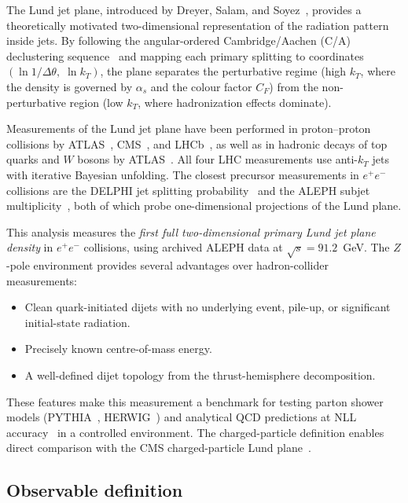 \documentclass[11pt,a4paper]{article}
\begin{document}
The Lund jet plane, introduced by Dreyer, Salam, and
Soyez~\cite{Dreyer:2018nbf}, provides a theoretically motivated
two-dimensional representation of the radiation pattern inside jets.
By following the angular-ordered Cambridge/Aachen (C/A)
declustering sequence~\cite{Dokshitzer:1997in} and mapping each
primary splitting to coordinates
$(\ln 1/\Delta\theta,\;\ln k_T)$, the plane separates the
perturbative regime (high $k_T$, where the density is governed by
$\alpha_s$ and the colour factor $C_F$) from the non-perturbative
region (low $k_T$, where hadronization effects dominate).

Measurements of the Lund jet plane have been performed in
proton--proton collisions by
ATLAS~\cite{ATLAS:2020bbn},
CMS~\cite{CMS:2024mlf},
and LHCb~\cite{LHCb:2025viq},
as well as in hadronic decays of top quarks and $W$ bosons by
ATLAS~\cite{ATLAS:2024wqo}.
All four LHC measurements use anti-$k_T$ jets with iterative
Bayesian unfolding.  The closest precursor measurements in
$e^+e^-$ collisions are the DELPHI jet splitting
probability~\cite{DELPHI:2003yqh} and the ALEPH subjet
multiplicity~\cite{ALEPH:1998hhp}, both of which probe
one-dimensional projections of the Lund plane.

This analysis measures the \emph{first full two-dimensional primary
Lund jet plane density} in $e^+e^-$ collisions, using archived
ALEPH data at $\sqrt{s} = 91.2$~GeV.  The $Z$-pole environment
provides several advantages over hadron-collider measurements:
\begin{itemize}
\item Clean quark-initiated dijets with no underlying event, pile-up,
  or significant initial-state radiation.
\item Precisely known centre-of-mass energy.
\item A well-defined dijet topology from the thrust-hemisphere
  decomposition.
\end{itemize}
These features make this measurement a benchmark for testing parton
shower models (PYTHIA~\cite{Sjostrand:2014zea,Skands:2014pea},
HERWIG~\cite{Bellm:2015jjp}) and analytical QCD predictions at NLL
accuracy~\cite{Lifson:2020gua} in a controlled environment.  The
charged-particle definition enables direct comparison with the CMS
charged-particle Lund plane~\cite{CMS:2024mlf}.

\subsection{Observable definition}
\label{sec:obs-def}
\end{document}
